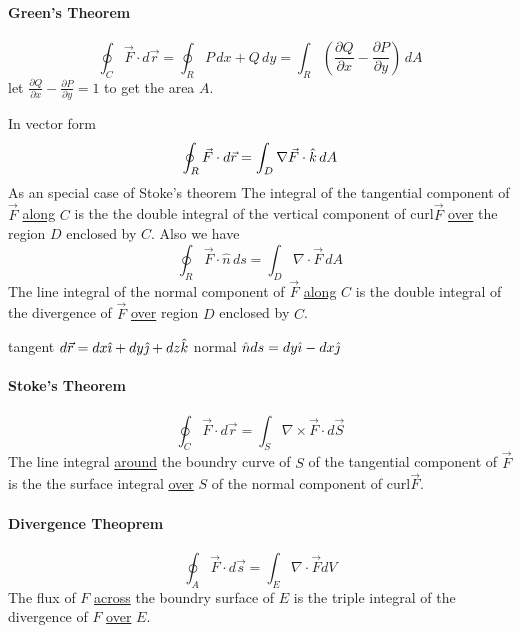         \paragraph{Green's Theorem}
            \[
                \oint_C \vec{F} \cdot d\vec{r} = \oint_R P\, dx + Q\, dy 
                = \int_R \left( \frac{\partial Q}{\partial x} - \frac{\partial P}{\partial y}  \right) \, dA
                \]
            let $ \frac{\partial Q}{\partial x} - \frac{\partial P}{\partial y} = 1$  to get the area $A$.

            In vector form 
            \[
                \oint_R \vec{F} \cdot d\vec{r} = \int_D \nabla{\vec{F}} \cdot \hat{k}\, dA
                \]
            As an special case of Stoke's theorem
            The integral of the tangential component of $\vec{F}$ \underline{along} $C$ is the the double integral of the vertical component of curl$\vec{F}$
            \underline{over} the region $D$ enclosed by $C$. Also we have
            \[
                \oint_R \vec{F} \cdot \hat{n} \, ds = \int_D \nabla \cdot \vec{F}\, dA 
                \]
            The line integral of the normal component of $\vec{F}$ \underline{along} $C$ is the double integral of the divergence of $\vec{F}$ 
            \underline{over} region $D$ enclosed by $C$.

            \starpar tangent $d\vec{r} = dx \hat{\imath} + dy \hat{\jmath} + dz \hat{k}$
            \starpar normal  $ \hat{n} ds = dy \hat{\imath} - dx \hat{\jmath}$

        \paragraph{Stoke's Theorem} 
        \[ 
            \oint_C \vec{F} \cdot d\vec{r} = \int_S \nabla \times \vec{F} \cdot d\vec{S}
            \]
        The line integral \underline{around} the boundry curve of $S$ of the tangential component of $\vec{F}$ is the the surface integral \underline{over}
        $S$ of the normal component of curl$\vec{F}$.

        \paragraph{Divergence Theoprem}
        \[
            \oint_A \vec{F} \cdot d\vec{s} = \int_E \nabla \cdot \vec{F} dV 
            \]
        The flux of $F$ \underline{across} the boundry surface of $E$ is the triple integral of the divergence of $F$ \underline{over} $E$.